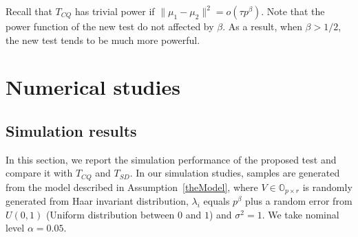 \documentclass[review]{elsarticle}
\theoremstyle{plain}
\theoremstyle{definition}
\theoremstyle{remark}
\begin{document}
 Recall that $T_{CQ}$ has trivial power if $\|\mu_1-\mu_2\|^2=o(\tau p^{\beta})$.
 Note that the power function of the new test do not affected by $\beta$.
 As a result, when $\beta>1/2$, the new test tends to be much more powerful.





\section{Numerical studies}
\subsection{Simulation results}


In this section, we report the simulation performance of the proposed test and compare it with $T_{CQ}$ and $T_{SD}$.
In our simulation studies, samples are generated from the model described in Assumption~\ref{theModel},   
    where $V\in\mathbb{O}_{p\times r}$ is randomly generated from Haar invariant distribution, $\lambda_{i}$ equals $p^{\beta}$ plus a random error from $U(0,1)$ (Uniform distribution between $0$ and $1$) and $\sigma^2=1$.
We take nominal level $\alpha=0.05$.

\end{document}
